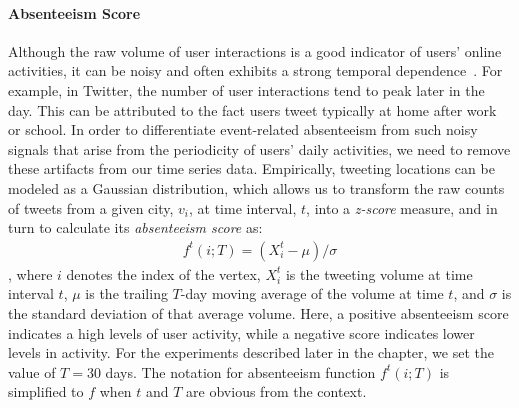 \vspace{-1mm}
\paragraph{\textbf{Absenteeism Score}}
Although the raw volume of user interactions is a good indicator of users' online activities, it can be noisy and often exhibits a strong temporal dependence~\cite{cho2011friendship}.
For example, in Twitter, the number of user interactions tend to peak later in the day.
This can be attributed to the fact users tweet typically at home after work or school.
In order to differentiate event-related absenteeism from such noisy signals that arise from the periodicity of users' daily activities, we need to remove these artifacts from our time series data.
Empirically, tweeting locations can be modeled as a Gaussian distribution, which allows us to transform the raw counts of tweets from a given city, $v_{i}$, at time interval, $t$, into a \textit{z-score} measure, and in turn to calculate its \textit{absenteeism score} as:
\begin{equation}
	\label{eq:zscore}
	\begin{array}{l}
		f^t(i;T) =(X^t_i-\mu)/{\sigma}
	\end{array}
\end{equation}
, where $i$ denotes the index of the vertex, $X^t_i$ is the tweeting volume at time interval $t$, $\mu$ is the trailing $T$-day moving average of the volume at time $t$, and $\sigma$ is the standard deviation of that average volume.
Here, a positive absenteeism score indicates a high levels of user activity, while a negative score indicates lower levels in activity.
For the experiments described later in the chapter, we set the value of $T=30$ days. The notation for absenteeism function $f^t(i;T)$ is simplified to $f$ when $t$ and $T$ are obvious from the context.

